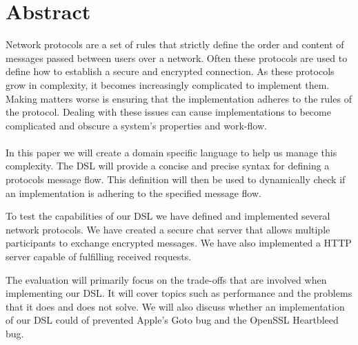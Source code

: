 \section*{Abstract}
Network protocols are a set of rules that strictly define the order and content of messages passed between users over a network. Often these protocols are used to define how to establish a secure and encrypted connection. As these protocols grow in complexity, it becomes increasingly complicated to implement them. Making matters worse is ensuring that the implementation adheres to the rules of the protocol. Dealing with these issues can cause implementations to become complicated and obscure a system's properties and work-flow.
\\\\
In this paper we will create a domain specific language to help us manage this complexity. The DSL will provide a concise and precise syntax for defining a protocols message flow. This definition will then be used to dynamically check if an implementation is adhering to the specified message flow. 

To test the capabilities of our DSL we have defined and implemented several network protocols. We have created a secure chat server that allows multiple participants to exchange encrypted messages. We have also implemented a HTTP server capable of fulfilling received requests.

The evaluation will primarily focus on the trade-offs that are involved when implementing our DSL. It will cover topics such as performance and the problems that it does and does not solve. We will also discuss whether an implementation of our DSL could of prevented Apple's Goto bug and the OpenSSL Heartbleed bug.
